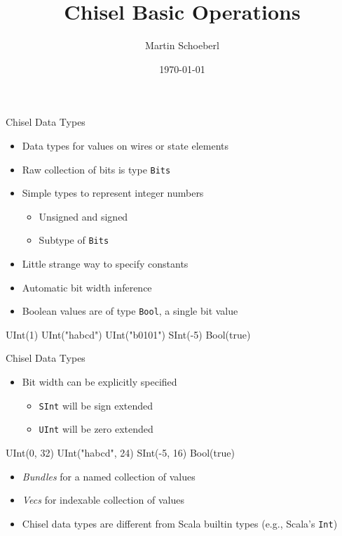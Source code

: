\documentclass[xcolor=pdflatex,dvipsnames,table]{beamer}
\title{Chisel Basic Operations}
\author{Martin Schoeberl}
\date{\today}
\institute{Technical University of Denmark}
\newcommand{\code}[1]{{\texttt{#1}}}
\begin{document}
\begin{frame}
\titlepage
\end{frame}

\begin{frame}[fragile]{Chisel Data Types}
\begin{itemize}
\item Data types for values on wires or state elements
\item Raw collection of bits is type \code{Bits}
\item Simple types to represent integer numbers
\begin{itemize}
\item Unsigned and signed
\item Subtype of \code{Bits}
\end{itemize}
\item Little strange way to specify constants
\item Automatic bit width inference
\item Boolean values are of type \code{Bool}, a single bit value
\end{itemize}
\begin{chisel}
UInt(1)
UInt("habcd")
UInt("b0101")
SInt(-5)
Bool(true)
\end{chisel}
\end{frame}

\begin{frame}[fragile]{Chisel Data Types}
\begin{itemize}
\item Bit width can be explicitly specified
\begin{itemize}
\item \code{SInt} will be sign extended
\item \code{UInt} will be zero extended
\end{itemize}
\end{itemize}
\begin{chisel}
UInt(0, 32)
UInt("habcd", 24)
SInt(-5, 16)
Bool(true)
\end{chisel}
\begin{itemize}
\item \emph{Bundles} for a named collection of values
\item \emph{Vecs} for indexable collection of values
\item Chisel data types are different from Scala builtin types (e.g., Scala's \code{Int})
\end{itemize}
\end{frame}
\end{document}
